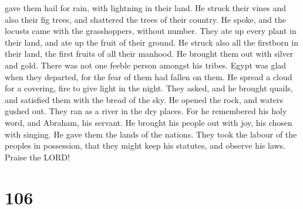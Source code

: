 gave them hail for rain, with lightning in their land.  He
struck their vines and also their fig trees, and shattered the trees of
their country.  He spoke, and the locusts came with the
grasshoppers, without number.  They ate up every plant in
their land, and ate up the fruit of their ground.  He
struck also all the firstborn in their land, the first fruits of all
their manhood.  He brought them out with silver and gold.
There was not one feeble person amongst his tribes.  Egypt
was glad when they departed, for the fear of them had fallen on them.
 He spread a cloud for a covering, fire to give light in
the night.  They asked, and he brought quails, and
satisfied them with the bread of the sky.  He opened the
rock, and waters gushed out. They ran as a river in the dry places.
 For he remembered his holy word, and Abraham, his servant.
 He brought his people out with joy, his chosen with
singing.  He gave them the lands of the nations. They took
the labour of the peoples in possession,  that they might
keep his statutes, and observe his laws. Praise the LORD!

\hypertarget{section-96}{%
\section{106}\label{section-96}}

